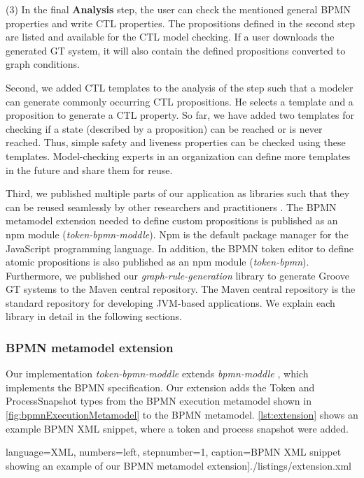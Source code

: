 \documentclass{lmcs} %
\begin{document}
(3) In the final \textbf{Analysis} step, the user can check the mentioned general BPMN properties and write CTL properties.
The propositions defined in the second step are listed and available for the CTL model checking.
If a user downloads the generated GT system, it will also contain the defined propositions converted to graph conditions.

Second, we added CTL templates to the analysis of the step such that a modeler can generate commonly occurring CTL propositions.
He selects a template and a proposition to generate a CTL property.
So far, we have added two templates for checking if a state (described by a proposition) can be reached or is never reached.
Thus, simple safety and liveness properties can be checked using these templates.
Model-checking experts in an organization can define more templates in the future and share them for reuse. 

Third, we published multiple parts of our application as libraries such that they can be reused seamlessly by other researchers and practitioners \cite{timkrauterLMCS2024Artifacts2023}.
The BPMN metamodel extension needed to define custom propositions is published as an npm module (\textit{token-bpmn-moddle}).
Npm is the default package manager for the JavaScript programming language.
In addition, the BPMN token editor to define atomic propositions is also published as an npm module (\textit{token-bpmn}).
Furthermore, we published our \textit{graph-rule-generation} library to generate Groove GT systems to the Maven central repository.
The Maven central repository is the standard repository for developing JVM-based applications.
We explain each library in detail in the following sections.

\subsubsection{BPMN metamodel extension}
Our implementation \textit{token-bpmn-moddle} \cite{timkrauterLMCS2024Artifacts2023} extends \textit{bpmn-moddle} \cite{camundaservicesgmbhBpmnmoddle2023}, which implements the BPMN specification.
Our extension adds the \textsf{Token} and \textsf{ProcessSnapshot} types from the BPMN execution metamodel shown in \autoref{fig:bpmnExecutionMetamodel} to the BPMN metamodel.
\autoref{lst:extension} shows an example BPMN XML snippet, where a token and process snapshot were added.

 language=XML, numbers=left,
    stepnumber=1, caption=BPMN XML snippet showing an example of our BPMN metamodel extension]{./listings/extension.xml}
\end{document}
